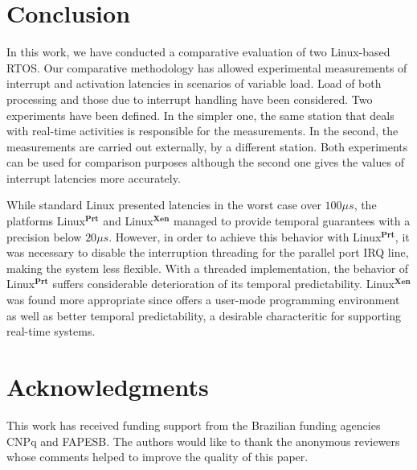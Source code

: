 \documentclass{acm_proc_article-sp}
\begin{document}
\section{Conclusion}
\label{sec:conc}

In this work, we have conducted a comparative evaluation of two Linux-based
RTOS. Our comparative methodology has allowed experimental
measurements of interrupt and activation latencies in scenarios of variable
load. Load of both processing and those due to interrupt handling have been
considered. Two experiments have been defined.  In the simpler one, the
same station that deals with real-time activities is responsible for the
measurements. In the second, the measurements are carried out externally, by a
different station. Both experiments can be used for comparison purposes although the
second one gives the values of interrupt latencies more accurately.

While standard Linux presented latencies in the worst case over $100 \mu s$, the
platforms Linux$^{\mathbf{Prt}}$ and Linux$^{\mathbf{Xen}}$ managed to provide
temporal guarantees with a precision below $20 \mu s$. However, in order to achieve
this behavior with Linux$^{\mathbf{Prt}}$, it was necessary to disable the
interruption threading for the parallel port IRQ line, making the system less
flexible. With a threaded implementation, the behavior of
Linux$^{\mathbf{Prt}}$ suffers considerable deterioration of its temporal
predictability.  Linux$^{\mathbf{Xen}}$ was found more appropriate since offers a
user-mode programming environment as well as better temporal predictability, a
desirable characteritic for supporting real-time systems.


\section*{Acknowledgments}

This work has received funding support from the Brazilian funding agencies CNPq and
FAPESB. The authors would like to thank the anonymous reviewers whose comments
helped to improve the quality of this paper.

 
\end{document}
